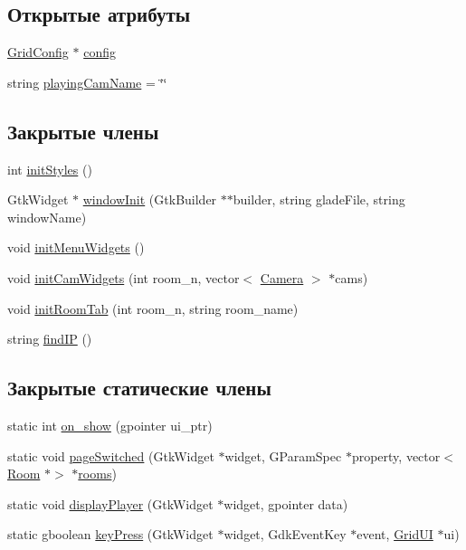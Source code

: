 \subsection*{Открытые атрибуты}
\begin{DoxyCompactItemize}
\item 
\hyperlink{class_grid_config}{Grid\+Config} $\ast$ \hyperlink{class_grid_u_i_aa25b4477bce884bea5e53a1d8df61bd6}{config}
\item 
string \hyperlink{class_grid_u_i_a2b04f88f8f2b63c60907a90a397fb4bb}{playing\+Cam\+Name} = \char`\"{}\char`\"{}
\end{DoxyCompactItemize}
\subsection*{Закрытые члены}
\begin{DoxyCompactItemize}
\item 
int \hyperlink{class_grid_u_i_a14fa8dea460f6fe6fed54e8f267ecd4e}{init\+Styles} ()
\item 
Gtk\+Widget $\ast$ \hyperlink{class_grid_u_i_a343652c0de7cd608a047ebad38c7a46c}{window\+Init} (Gtk\+Builder $\ast$$\ast$builder, string glade\+File, string window\+Name)
\item 
void \hyperlink{class_grid_u_i_ae8dc93dea42ac08339f9e5b774ca9af4}{init\+Menu\+Widgets} ()
\item 
void \hyperlink{class_grid_u_i_a2bbb2ec1b28ee7bce2c59e2315576803}{init\+Cam\+Widgets} (int room\+\_\+n, vector$<$ \hyperlink{struct_camera}{Camera} $>$ $\ast$cams)
\item 
void \hyperlink{class_grid_u_i_aff8b9292dc0c25bd03ae543738859a26}{init\+Room\+Tab} (int room\+\_\+n, string room\+\_\+name)
\item 
string \hyperlink{class_grid_u_i_a73a5b4a63e6e6dd0b58b962295b8fa0f}{find\+IP} ()
\end{DoxyCompactItemize}
\subsection*{Закрытые статические члены}
\begin{DoxyCompactItemize}
\item 
static int \hyperlink{class_grid_u_i_aacb45638d1ac54877cbc516ce220b361}{on\+\_\+show} (gpointer ui\+\_\+ptr)
\item 
static void \hyperlink{class_grid_u_i_a6d9d6f5fe5e1b00460f25d394920f977}{page\+Switched} (Gtk\+Widget $\ast$widget, G\+Param\+Spec $\ast$property, vector$<$ \hyperlink{class_room}{Room} $\ast$$>$ $\ast$\hyperlink{class_grid_u_i_ad23d09850beb8360fbeaaa434a38abb6}{rooms})
\item 
static void \hyperlink{class_grid_u_i_a11288c74a4c369aabb0ca17da1495a5d}{display\+Player} (Gtk\+Widget $\ast$widget, gpointer data)
\item 
static gboolean \hyperlink{class_grid_u_i_acb700da4a4b35b9a142eff7537a67d6e}{key\+Press} (Gtk\+Widget $\ast$widget, Gdk\+Event\+Key $\ast$event, \hyperlink{class_grid_u_i}{Grid\+UI} $\ast$ui)
\end{DoxyCompactItemize}
